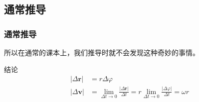 \subsection{通常推导}
    \begin{frame}
    \frametitle{通常推导}
    所以在通常的课本上，我们推导时就不会发现这种奇妙的事情。
    \begin{block}{结论}
    \begin{align}
    |\Delta \mathbf{r}|&=r\Delta\varphi \\
    |\Delta \mathbf{v}|&=\lim_{\Delta t \rightarrow 0} \frac{|\Delta \mathbf{r}|}{\Delta t}= r \lim_{\Delta t \rightarrow 0}\frac{|\Delta \varphi|}{\Delta t}= \omega r
    \end{align}
    \end{block}
    \end{frame}